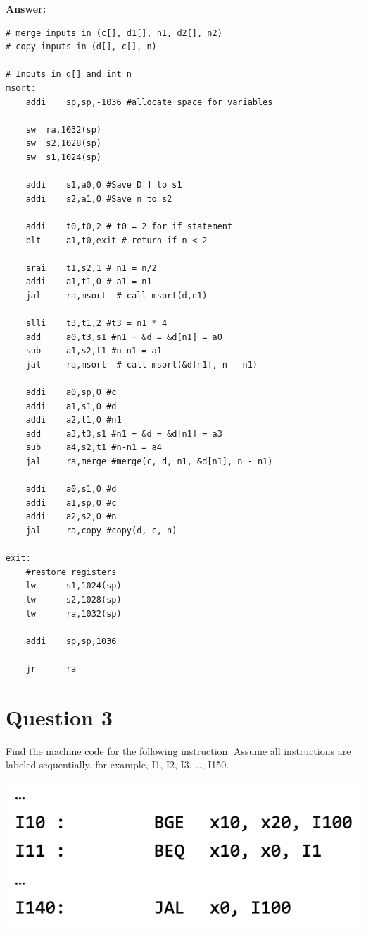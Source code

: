 \documentclass{article}
\begin{document}
\textbf{Answer:}
\begin{lstlisting}
# merge inputs in (c[], d1[], n1, d2[], n2)
# copy inputs in (d[], c[], n)

# Inputs in d[] and int n
msort:
	addi	sp,sp,-1036 #allocate space for variables
	
	sw	ra,1032(sp)
	sw	s2,1028(sp)
	sw	s1,1024(sp) 
	
	addi	s1,a0,0 #Save D[] to s1
	addi	s2,a1,0 #Save n to s2
	
	addi	t0,t0,2 # t0 = 2 for if statement
	blt		a1,t0,exit # return if n < 2

	srai	t1,s2,1 # n1 = n/2
	addi	a1,t1,0 # a1 = n1
	jal     ra,msort  # call msort(d,n1)
	
	slli	t3,t1,2 #t3 = n1 * 4
	add     a0,t3,s1 #n1 + &d = &d[n1] = a0
	sub     a1,s2,t1 #n-n1 = a1
	jal     ra,msort  # call msort(&d[n1], n - n1)
	
	addi    a0,sp,0 #c
	addi    a1,s1,0 #d
	addi    a2,t1,0 #n1
	add     a3,t3,s1 #n1 + &d = &d[n1] = a3
	sub     a4,s2,t1 #n-n1 = a4
	jal     ra,merge #merge(c, d, n1, &d[n1], n - n1)
	
	addi	a0,s1,0 #d
	addi	a1,sp,0 #c
	addi	a2,s2,0 #n
	jal     ra,copy #copy(d, c, n)
	
exit:
	#restore registers
	lw      s1,1024(sp) 
	lw      s2,1028(sp)
	lw      ra,1032(sp)
	
	addi    sp,sp,1036 
	
	jr      ra
\end{lstlisting}

\section*{Question 3}
Find the machine code for the following instruction. Assume all instructions are labeled
sequentially, for example, I1, I2, I3, …, I150. 

\begin{center}
    \includegraphics[scale=.75]{images/Q3.png}
\end{center}
\end{document}
